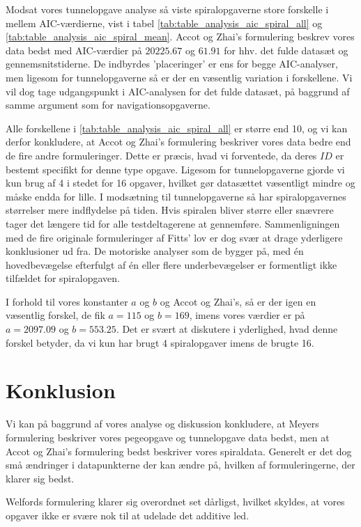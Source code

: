 Modsat vores tunnelopgave analyse så viste spiralopgaverne store forskelle i mellem AIC-værdierne, vist i tabel \ref{tab:table_analysis_aic_spiral_all} og \ref{tab:table_analysis_aic_spiral_mean}. Accot og Zhai's formulering beskrev vores data bedst med AIC-værdier på $20225.67$ og $61.91$ for hhv. det fulde datasæt og gennemsnitstiderne. De indbyrdes 'placeringer' er ens for begge AIC-analyser, men ligesom for tunnelopgaverne så er der en væsentlig variation i forskellene. Vi vil dog tage udgangspunkt i AIC-analysen for det fulde datasæt, på baggrund af samme argument som for navigationsopgaverne.

Alle forskellene i \ref{tab:table_analysis_aic_spiral_all} er større end 10, og vi kan derfor konkludere, at Accot og Zhai's formulering beskriver vores data bedre end de fire andre formuleringer. Dette er præcis, hvad vi forventede, da deres $ID$ er bestemt specifikt for denne type opgave. Ligesom for tunnelopgaverne gjorde vi kun brug af 4 i stedet for 16 opgaver, hvilket gør datasættet væsentligt mindre og måske endda for lille. I modsætning til tunnelopgaverne så har spiralopgavernes størrelser mere indflydelse på tiden. Hvis spiralen bliver større eller snævrere tager det længere tid for alle testdeltagerene at gennemføre. Sammenligningen med de fire originale formuleringer af Fitts' lov er dog svær at drage yderligere konklusioner ud fra. De motoriske analyser som de bygger på, med én hovedbevægelse efterfulgt af én eller flere underbevægelser er formentligt ikke tilfældet for spiralopgaven.

I forhold til vores konstanter $a$ og $b$ og Accot og Zhai's, så er der igen en væsentlig forskel, de fik $a=115$ og $b=169$, imens vores værdier er på $a=2097.09$ og $b=553.25$. Det er svært at diskutere i yderlighed, hvad denne forskel betyder, da vi kun har brugt 4 spiralopgaver imens de brugte 16.

\chapter*{Konklusion}
Vi kan på baggrund af vores analyse og diskussion konkludere, at Meyers formulering beskriver vores pegeopgave og tunnelopgave data bedst, men at Accot og Zhai's formulering bedst beskriver vores spiraldata. Generelt er det dog små ændringer i datapunkterne der kan ændre på, hvilken af formuleringerne, der klarer sig bedst.

Welfords formulering klarer sig overordnet set dårligst, hvilket skyldes, at vores opgaver ikke er svære nok til at udelade det additive led.

